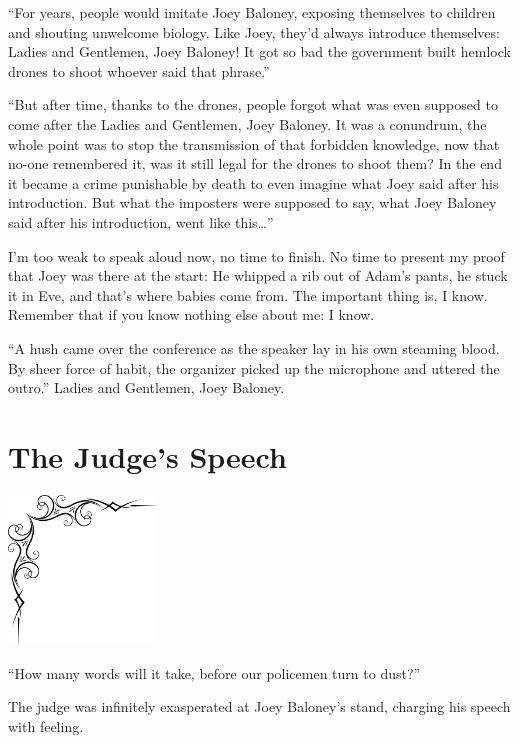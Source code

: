 \documentclass[oneside]{book}
\begin{document}
``For years, people would imitate Joey Baloney, exposing themselves to children
and shouting unwelcome biology.  Like Joey, they'd always introduce themselves:
Ladies and Gentlemen, Joey Baloney!  It got so bad the government built
hemlock drones to shoot whoever said that phrase.''

``But after time, thanks to the drones, people forgot what was even supposed to come
after the Ladies and Gentlemen, Joey Baloney.  It was a conundrum, the
whole point was to stop the transmission of that forbidden knowledge,
now that no-one remembered it, was it still legal for the drones to shoot them?
In the end it became a crime punishable by death to even imagine what Joey
said after his introduction.
But what the imposters were supposed to say, what Joey Baloney said after his
introduction, went like this\ldots''

I'm too weak to speak aloud now, no time to finish.
No time to present my proof that Joey was there at the start:
He whipped a rib out of Adam's pants, he stuck it in Eve, and that's where
babies come from.  The important thing is, I know.
Remember that if you know nothing else about me: I know.

``A hush came over the conference as the speaker lay in his own steaming blood.
By sheer force of habit, the organizer picked up the microphone and uttered the
outro.''  Ladies and Gentlemen, Joey Baloney.


\chapter{The Judge's Speech}

\vspace{-2in}
\hspace{-.5in}
\includegraphics[width=150px]{ulcorner1.eps}

``How many words will it take, before our policemen turn to dust?''

The judge was infinitely exasperated at Joey Baloney's stand,
charging his speech with feeling.
\end{document}
